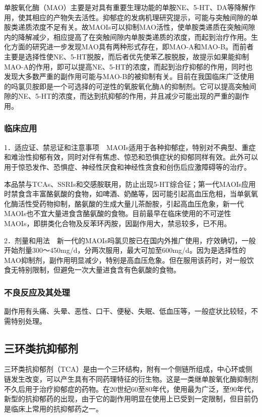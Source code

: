 单胺氧化酶（MAO）主要是对具有重要生理功能的单胺NE、5-HT、DA等降解作用，使其相应的产物失去活性。抑郁症的发病机理研究提示，可能与突触间隙的单胺类递质浓度不足有关。故MAOIs可以抑制MAO活性，使单胺类递质在突触间隙内的降解减少，相应提高了在突触间隙内单胺类递质的浓度，而起到治疗作用。生化方面的研究进一步发现MAO具有两种形式存在，即MAO-A和MAO-B。而前者主要是选择性使NE、5-HT脱胺，而后者优先使苯乙胺脱胺，故提示如果能抑制MAO-A的作用，即可以提高NE、5-HT的浓度，而起到治疗抑郁的作用，同时也发现大多数严重的副作用可能与MAO-B的被抑制有关。目前在我国临床广泛使用的吗氯贝胺即是一个可选择的可逆性的氧胺氧化酶A的抑制剂。它可以提高突触间隙的NE、5-HT的浓度，而达到抗抑郁的作用，并且减少可能出现的严重的副作用。

\subsubsection{临床应用}

1．适应证、禁忌证和注意事项　MAOIs适用于各种抑郁症，特别对不典型、重症和难治性抑郁有效，同时对伴有焦虑、惊恐和恐惧症状的抑郁同样有效。此外可以用于惊恐发作、恐惧症、神经性厌食和神经性贪食和创伤后应激障碍等的治疗。

本品禁与TCAs、SSRIs和交感胺联用，防止出现5-HT综合征；第一代MAOIs应用时禁食含丰富酪氨酸的食物，如啤酒、奶酪等，因可能引起高血压危相，当单氨氧化酶活性受药物抑制，酪氨酸的生成大量儿茶酚胺，引起高血压危象，新一代MAOIs也不宜大量进食含酪氨酸的食物。目前最早在临床使用的不可逆性MAOIs，即肼类化合物及反苯环丙胺，因副作用大，禁忌较多，已不用。

2．剂量和用法　新一代的MAOIs吗氯贝胺已在国内外推广使用，疗效确切，一般开始剂量300～450mg/d，分两次服用，最大可加至600mg/d。因为是选择性的MAO抑制剂，副作用明显减少，特别是高血压危象。但在服用该药时，对一般饮食无特别限制，但避免一次大量进食含有色氨酸的食物。

\subsubsection{不良反应及其处理}

副作用有头痛、头晕、恶性、口干、便秘、失眠、低血压等，一般症状比较轻，不需特别处理。

\subsection{三环类抗抑郁剂}

三环类抗抑郁剂（TCA）是由一个三环结构，附有一个侧链所组成，中心环或侧链发生改变，可以产生具有不同药理特征的衍生物。这是一类继单胺氧化酶抑制剂不久后用于治疗抑郁症的药物。在20世纪60至80年代，使用最为广泛，至90年代，新型的抗抑郁药的出现，由于它的副作用明显在使用上已受到一定限制，但目前仍是临床上常用的抗抑郁药之一。

